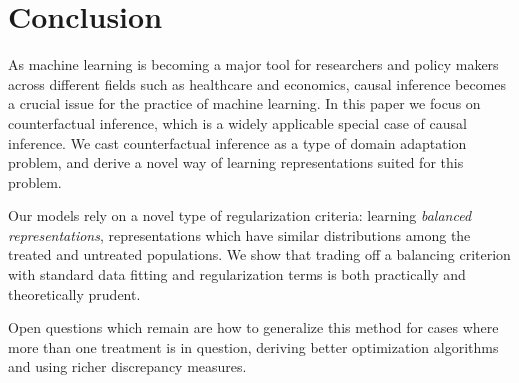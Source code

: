 \section{Conclusion}
As machine learning is becoming a major tool for researchers and policy makers across different fields such as healthcare and economics, causal inference becomes a crucial issue for the practice of machine learning. In this paper we focus on counterfactual inference, which is a widely applicable special case of causal inference. We cast counterfactual inference as a type of domain adaptation problem, and derive a novel way of learning representations suited for this problem.

Our models rely on a novel type of regularization criteria: learning \emph{balanced representations}, representations which have similar distributions among the treated and untreated populations. We show that trading off a balancing criterion with standard data fitting and regularization terms is both practically and theoretically prudent.

Open questions which remain are how to generalize this method for cases where more than one treatment is in question, deriving better optimization algorithms and using richer discrepancy measures.
